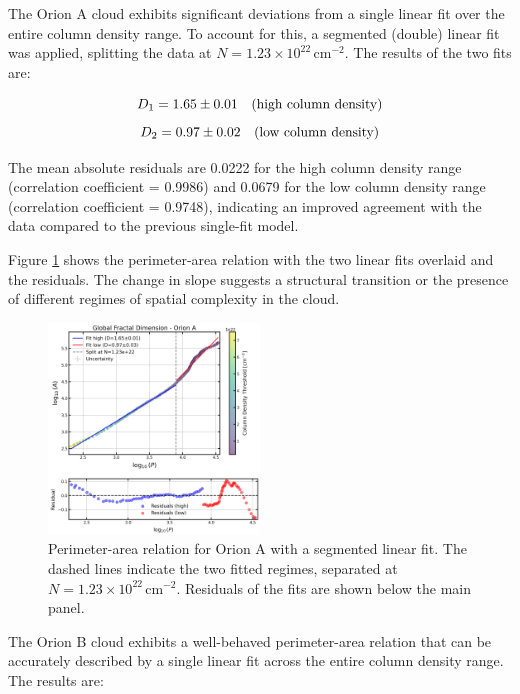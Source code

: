 The Orion A cloud exhibits significant deviations from a single linear fit over the entire column density range. To account for this, a segmented (double) linear fit was applied, splitting the data at $N = 1.23 \times 10^{22}\,\mathrm{cm}^{-2}$. The results of the two fits are:

\begin{equation}
    \notag
    D_1 = 1.65 \pm 0.01 \quad \text{(high column density)}
\end{equation}
\begin{equation}
    \notag
    D_2 = 0.97 \pm 0.02 \quad \text{(low column density)}
\end{equation}

The mean absolute residuals are 0.0222 for the high column density range (correlation coefficient = 0.9986) and 0.0679 for the low column density range (correlation coefficient = 0.9748), indicating an improved agreement with the data compared to the previous single-fit model.

Figure \ref{fig:orion_A_global_double_fit} shows the perimeter-area relation with the two linear fits overlaid and the residuals. The change in slope suggests a structural transition or the presence of different regimes of spatial complexity in the cloud.

\begin{figure}[t]
    \centering
    \includegraphics[width=0.5\textwidth]{figures/orion_A_global_double_fit.png}
    \caption{Perimeter-area relation for Orion A with a segmented linear fit. The dashed lines indicate the two fitted regimes, separated at $N=1.23 \times 10^{22}\,\mathrm{cm}^{-2}$. Residuals of the fits are shown below the main panel.}
    \label{fig:orion_A_global_double_fit}
\end{figure}

The Orion B cloud exhibits a well-behaved perimeter-area relation that can be accurately described by a single linear fit across the entire column density range. The results are:

